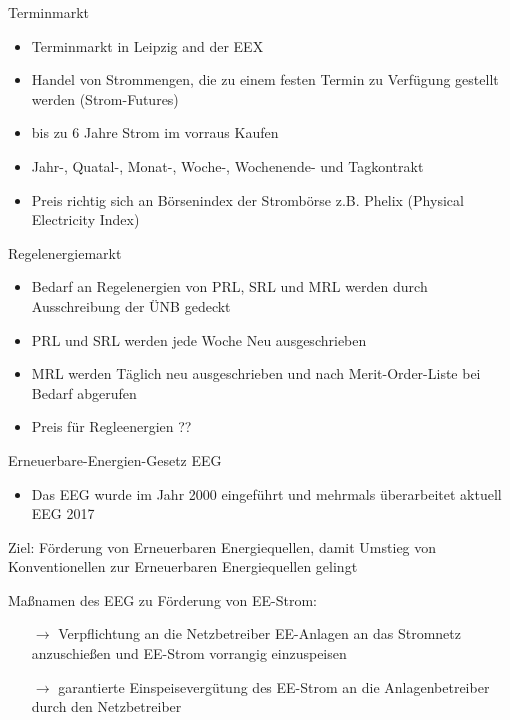\documentclass[aspectratio=1610, professionalfonts, 9pt]{beamer}
\begin{document}
\begin{frame}{Terminmarkt}
\begin{itemize}
  \item Terminmarkt in Leipzig and der EEX
  \item Handel von Strommengen, die zu einem festen Termin zu Verfügung gestellt werden (Strom-Futures)
  \item bis zu 6 Jahre Strom im vorraus Kaufen
  \item Jahr-, Quatal-, Monat-, Woche-,  Wochenende- und Tagkontrakt
  \item Preis richtig sich an Börsenindex der Strombörse z.B. Phelix (Physical Electricity Index)
\end{itemize}
\end{frame}

\begin{frame}{Regelenergiemarkt}
\begin{itemize}
  \item Bedarf an Regelenergien von PRL, SRL und MRL werden durch Ausschreibung
der ÜNB gedeckt
\item PRL und SRL werden jede Woche Neu ausgeschrieben
\item MRL werden Täglich neu ausgeschrieben und nach Merit-Order-Liste bei Bedarf abgerufen
\item Preis für Regleenergien ??
\end{itemize}

\end{frame}
\begin{frame}{Erneuerbare-Energien-Gesetz EEG}
   \begin{itemize}
     \item Das EEG wurde im Jahr 2000 eingeführt und mehrmals überarbeitet aktuell EEG 2017
   \end{itemize}
\pause
    \begin{block}{Ziel:}
      Förderung von Erneuerbaren Energiequellen, damit Umstieg von Konventionellen zur Erneuerbaren Energiequellen gelingt
    \end{block}
\pause
    \begin{block}{Maßnamen des EEG zu Förderung von EE-Strom:}
     \begin{itemize}
       \item[$\rightarrow$] Verpflichtung an die Netzbetreiber EE-Anlagen an das Stromnetz anzuschießen und EE-Strom vorrangig einzuspeisen
       \item[$\rightarrow$] garantierte Einspeisevergütung des EE-Strom an die Anlagenbetreiber durch den Netzbetreiber
   \end{itemize}
   \end{block}
\end{frame}
\end{document}
